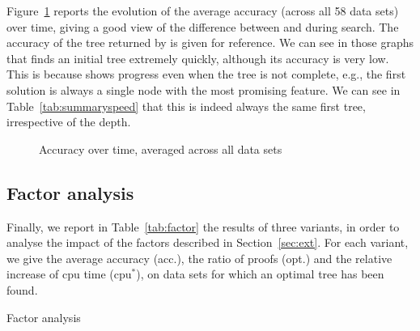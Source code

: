 \documentclass{article}
\begin{document}
% 



Figure~\ref{fig:acccactus} reports the evolution of the average accuracy (across all 58 data sets) over time, giving a good view of the difference between \murtree and \blossom during search. The accuracy of the tree returned by \cart is given for reference. 
We can see in those graphs that \murtree finds an initial tree extremely quickly, although its accuracy is very low. This is because \murtree shows progress even when the tree is not complete, e.g., the first solution is always a single node with the most promising feature. We can see in Table~\ref{tab:summaryspeed} that this is indeed always the same first tree, irrespective of the depth.



\begin{figure}[htbp]
	\subfloat[maximum depth = 4]{}
	\subfloat[maximum depth = 7]{}
	\subfloat[maximum depth = 10]{}
	\caption{\label{fig:acccactus}Accuracy over time, averaged across all data sets}
\end{figure}


\subsection{Factor analysis}

Finally, we report in Table~\ref{tab:factor} the results of three variants, in order to analyse the impact of the factors described in Section~\ref{sec:ext}. For each variant, we give the average accuracy (acc.), the ratio of proofs (opt.) and the relative increase of cpu time (cpu$^*$), on data sets for which an optimal tree has been found.

\begin{table}[htbp]
\begin{center}
\begin{footnotesize}
\tabcolsep=6pt

\end{footnotesize}
\end{center}
\caption{\label{tab:factor} Factor analysis}
\end{table}
\end{document}
